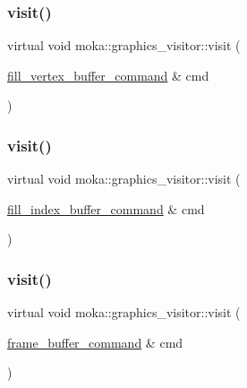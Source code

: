 \mbox{\label{classmoka_1_1graphics__visitor_acb45af562db73ae20f1566246f1dec00}} 
\subsubsection{\texorpdfstring{visit()}{visit()}\hspace{0.1cm}{\footnotesize\ttfamily [5/10]}}
{\footnotesize\ttfamily virtual void moka\+::graphics\+\_\+visitor\+::visit (\begin{DoxyParamCaption}\item[{\mbox{\hyperlink{classmoka_1_1fill__vertex__buffer__command}{fill\+\_\+vertex\+\_\+buffer\+\_\+command}} \&}]{cmd }\end{DoxyParamCaption})\hspace{0.3cm}{\ttfamily [pure virtual]}}

\mbox{\label{classmoka_1_1graphics__visitor_ab04b60a937648b132c43a6c8b0e7bd64}} 
\subsubsection{\texorpdfstring{visit()}{visit()}\hspace{0.1cm}{\footnotesize\ttfamily [6/10]}}
{\footnotesize\ttfamily virtual void moka\+::graphics\+\_\+visitor\+::visit (\begin{DoxyParamCaption}\item[{\mbox{\hyperlink{classmoka_1_1fill__index__buffer__command}{fill\+\_\+index\+\_\+buffer\+\_\+command}} \&}]{cmd }\end{DoxyParamCaption})\hspace{0.3cm}{\ttfamily [pure virtual]}}

\mbox{\label{classmoka_1_1graphics__visitor_a3e9f360d22b60c1b4ee3f9fd57df2447}} 
\subsubsection{\texorpdfstring{visit()}{visit()}\hspace{0.1cm}{\footnotesize\ttfamily [7/10]}}
{\footnotesize\ttfamily virtual void moka\+::graphics\+\_\+visitor\+::visit (\begin{DoxyParamCaption}\item[{\mbox{\hyperlink{classmoka_1_1frame__buffer__command}{frame\+\_\+buffer\+\_\+command}} \&}]{cmd }\end{DoxyParamCaption})\hspace{0.3cm}{\ttfamily [pure virtual]}}

